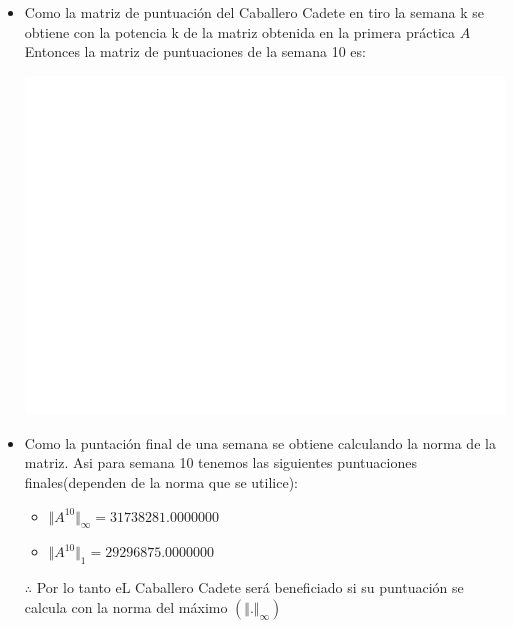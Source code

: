 \documentclass[12pt,a4paper]{article}
\begin{document}
\begin{itemize}
	\item Como la matriz de puntuación del Caballero Cadete en tiro la semana k se obtiene con la potencia k de la matriz obtenida en la primera práctica $A$
	Entonces la matriz de puntuaciones de la semana  10 es:
	\begin{center}
		\includegraphics[page=3,trim= 4.3cm 4cm 4cm 4cm, clip, scale=0.75]{MatrixSimb}
	\end{center}
	
	\item Como la puntación final de una semana se obtiene calculando la norma de la matriz. Asi para semana 10 tenemos las siguientes puntuaciones finales(dependen de la norma que se utilice):
	\begin{itemize}
		\item $\Vert A^{10}\Vert_{\infty} = 31738281.0000000$
		\item $\Vert A^{10}\Vert_{1} = 29296875.0000000$
	\end{itemize}
	$\therefore$ Por lo tanto eL Caballero Cadete será beneficiado si su puntuación se calcula con la norma del máximo $(\Vert .\Vert_{\infty})$
\end{itemize}
\end{document}
